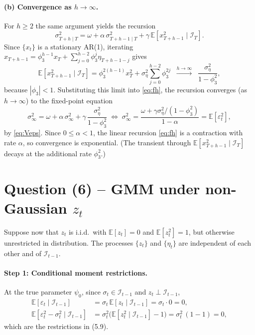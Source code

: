 \documentclass[12pt]{article}
\newcommand{\E}{\mathbb{E}}
\newcommand{\Info}{\mathcal{I}}
\begin{document}
\paragraph{(b) Convergence as $h\to\infty$.} For $h\geq 2$ the same argument yields the recursion
\begin{equation}
\sigma_{T+h\mid T}^2 = \omega + \alpha\,\sigma_{T+h-1\mid T}^2 + \gamma\,\E[x_{T+h-1}^2\mid\Info_T].\label{eq:fh}
\end{equation}
Since $\{x_t\}$ is a stationary AR(1), iterating $x_{T+h-1}=\phi_3^{h-1}x_T+\sum_{j=0}^{h-2}\phi_3^{j}\eta_{T+h-1-j}$ gives
\begin{equation*}
\E[x_{T+h-1}^2\mid\Info_T] = \phi_3^{2(h-1)} x_T^2 + \sigma_\eta^2\sum_{j=0}^{h-2}\phi_3^{2j}
\;\;\xrightarrow{h\to\infty}\;\;\frac{\sigma_\eta^2}{1-\phi_3^2},
\end{equation*}
because $|\phi_3|<1$. Substituting this limit into \eqref{eq:fh}, the recursion converges (as $h\to\infty$) to the fixed-point equation
\begin{equation*}
\sigma_{\infty}^2 = \omega + \alpha\,\sigma_{\infty}^2 + \gamma\,\frac{\sigma_\eta^2}{1-\phi_3^2}
\;\Longleftrightarrow\;
\sigma_{\infty}^2 = \frac{\omega+\gamma\sigma_\eta^2/(1-\phi_3^2)}{1-\alpha} = \E[\varepsilon_t^2],
\end{equation*}
by \eqref{eq:Veps}. Since $0\leq\alpha<1$, the linear recursion \eqref{eq:fh} is a contraction with rate $\alpha$, so convergence is exponential. (The transient through $\E[x_{T+h-1}^2\mid\Info_T]$ decays at the additional rate $\phi_3^2$.)

\section*{Question (6) -- GMM under non-Gaussian $z_t$}

Suppose now that $z_t$ is i.i.d.\ with $\E[z_t]=0$ and $\E[z_t^2]=1$, but otherwise unrestricted in distribution. The processes $\{z_t\}$ and $\{\eta_t\}$ are independent of each other and of $\Info_{t-1}$.

\paragraph{Step 1: Conditional moment restrictions.} At the true parameter $\psi_0$, since $\sigma_t\in\Info_{t-1}$ and $z_t\perp\Info_{t-1}$,
\begin{align}
\E[\varepsilon_t\mid\Info_{t-1}]
&= \sigma_t\,\E[z_t\mid\Info_{t-1}] = \sigma_t\cdot 0 = 0,\label{eq:mom1}\\
\E[\varepsilon_t^2-\sigma_t^2\mid\Info_{t-1}]
&= \sigma_t^2\big(\E[z_t^2\mid\Info_{t-1}]-1\big) = \sigma_t^2\,(1-1) = 0,\label{eq:mom2}
\end{align}
which are the restrictions in (5.9).
\end{document}

